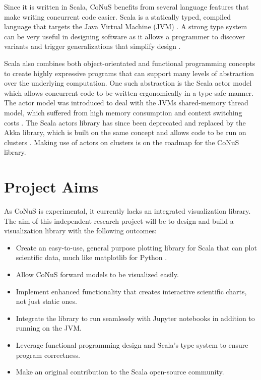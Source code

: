 \documentclass[12pt]{article}
\begin{document}
Since it is written in Scala, CoNuS benefits from several language features that make writing concurrent code easier. Scala is a statically typed, compiled language that targets the Java Virtual Machine (JVM) \autocite{scala}. A strong type system can be very useful in designing software as it allows a programmer to discover variants and trigger generalizations that simplify design \autocite{LAMMEL20081}. 

Scala also combines both object-orientated and functional programming concepts to create highly expressive programs that can support many levels of abstraction over the underlying computation. One such abstraction is the Scala actor model which allows concurrent code to be written ergonomically in a type-safe manner. The actor model was introduced to deal with the JVMs shared-memory thread model, which suffered from high memory consumption and context switching costs \autocite{haller_odersky_2009}. The Scala actors library has since been deprecated and replaced by the Akka library, which is built on the same concept and allows code to be run on clusters \autocite{akka}. Making use of actors on clusters is on the roadmap for the CoNuS library.

\section{Project Aims}
As CoNuS is experimental, it currently lacks an integrated visualization library. The aim of this independent research project will be to design and build a visualization library with the following outcomes:

\begin{itemize}
\item Create an easy-to-use, general purpose plotting library for Scala that can plot scientific data, much like matplotlib for Python \autocite{matplotlib}.
\item Allow CoNuS forward models to be visualized easily.
\item Implement enhanced functionality that creates interactive scientific charts, not just static ones. 
\item Integrate the library to run seamlessly with Jupyter notebooks in addition to running on the JVM.
\item Leverage functional programming design and Scala's type system to ensure program correctness.
\item Make an original contribution to the Scala open-source community.
\end{itemize}
\end{document}
